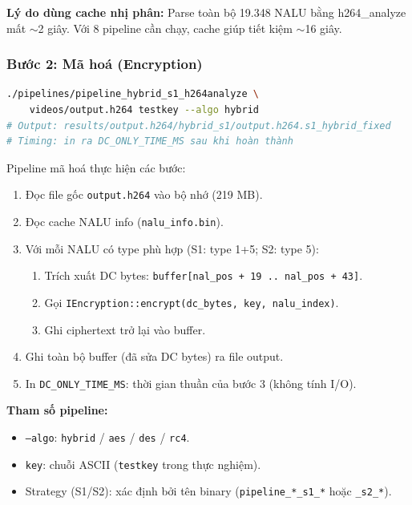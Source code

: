 \textbf{Lý do dùng cache nhị phân:} Parse toàn bộ 19.348 NALU bằng h264\_analyze
mất $\sim$2 giây. Với 8 pipeline cần chạy, cache giúp tiết kiệm $\sim$16 giây.

\subsubsection{Bước 2: Mã hoá (Encryption)}

\begin{lstlisting}[language=bash, caption={Mã hoá DC bytes với strategy S1 và algo hybrid}]
./pipelines/pipeline_hybrid_s1_h264analyze \
    videos/output.h264 testkey --algo hybrid
# Output: results/output.h264/hybrid_s1/output.h264.s1_hybrid_fixed
# Timing: in ra DC_ONLY_TIME_MS sau khi hoàn thành
\end{lstlisting}

Pipeline mã hoá thực hiện các bước:
\begin{enumerate}
  \item Đọc file gốc \texttt{output.h264} vào bộ nhớ (219 MB).
  \item Đọc cache NALU info (\texttt{nalu\_info.bin}).
  \item Với mỗi NALU có type phù hợp (S1: type 1+5; S2: type 5):
    \begin{enumerate}
      \item Trích xuất DC bytes: \texttt{buffer[nal\_pos + 19 .. nal\_pos + 43]}.
      \item Gọi \texttt{IEncryption::encrypt(dc\_bytes, key, nalu\_index)}.
      \item Ghi ciphertext trở lại vào buffer.
    \end{enumerate}
  \item Ghi toàn bộ buffer (đã sửa DC bytes) ra file output.
  \item In \texttt{DC\_ONLY\_TIME\_MS}: thời gian thuần của bước 3 (không tính I/O).
\end{enumerate}

\textbf{Tham số pipeline:}
\begin{itemize}
  \item \texttt{--algo}: \texttt{hybrid} / \texttt{aes} / \texttt{des} / \texttt{rc4}.
  \item \texttt{key}: chuỗi ASCII (\texttt{testkey} trong thực nghiệm).
  \item Strategy (S1/S2): xác định bởi tên binary (\texttt{pipeline\_*\_s1\_*} hoặc \texttt{\_s2\_*}).
\end{itemize}

